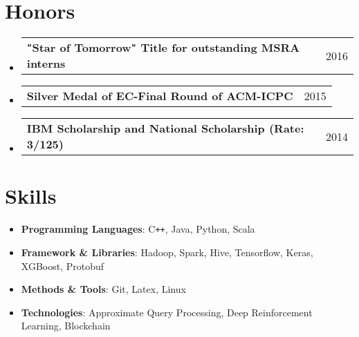 \documentclass[a4paper,11pt]{article}
\makeatletter
\newcommand{\resumeMiniheading}[2]{
  \vspace{-1pt}\item
    \begin{tabular*}{0.97\textwidth}{l@{\extracolsep{\fill}}r}
      \textbf{#1} & #2
    \end{tabular*}
}
\makeatother
\begin{document}
\section{Honors}
  \begin{itemize}[leftmargin=*, itemsep=-1pt, label={}]
    \resumeMiniheading{"Star of Tomorrow" Title for outstanding MSRA interns \normalfont{(Rate: 10\%)}}{2016}
    \resumeMiniheading{Silver Medal of EC-Final Round of ACM-ICPC}{2015}
    \resumeMiniheading{IBM Scholarship and National Scholarship {\normalfont(Rate: 3/125)}}{2014}
  \end{itemize}

\section{Skills}
  \begin{itemize}[leftmargin=*, itemsep=-2pt, label={}]
    \item{
      \textbf{Programming Languages}{: C\texttt{++}, Java, Python, Scala}
    }
    \item{
      \textbf{Framework \& Libraries}{: Hadoop, Spark, Hive, Tensorflow, Keras, XGBoost, Protobuf}
    }
    \item{
      \textbf{Methods \& Tools}{: Git, Latex, Linux}
    }
    \item{
      \textbf{Technologies}{: Approximate Query Processing, Deep Reinforcement Learning, Blockchain}
    }
  \end{itemize}


\end{document}
